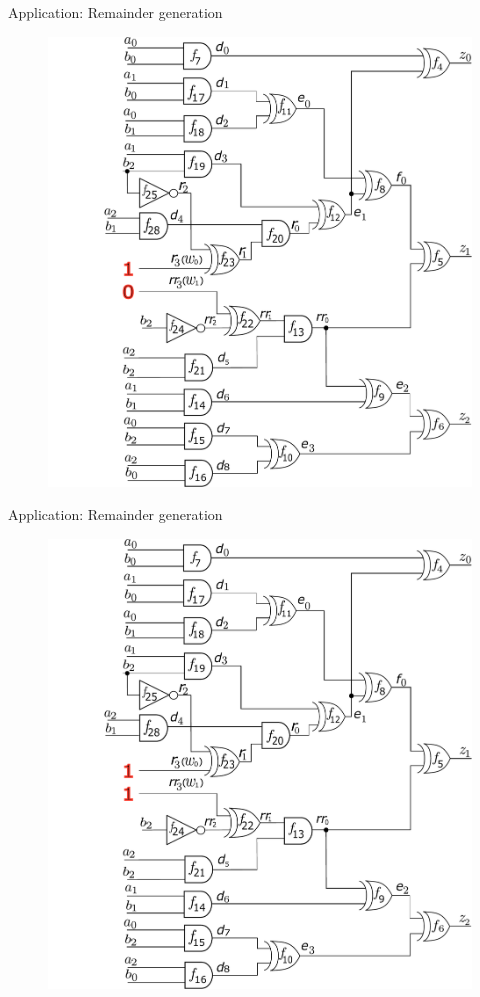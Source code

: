 \begin{frame}{\large Application: Remainder generation}
\begin{figure}[hbt]
\centering
    \includegraphics[scale = 0.28]{mas_3_ddc_mfr_b_01.pdf}
    \caption*{}
\end{figure}
\end{frame}

\begin{frame}{\large Application: Remainder generation}
\begin{figure}[hbt]
\centering
    \includegraphics[scale = 0.28]{mas_3_ddc_mfr_b_11.pdf}
    \caption*{}
\end{figure}
\end{frame}

